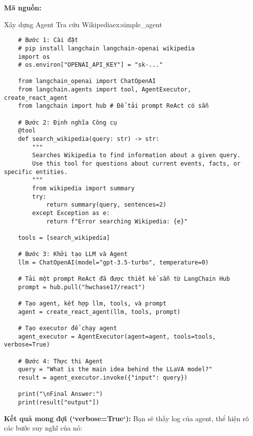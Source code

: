 \textbf{Mã nguồn:}
\begin{example}{Xây dựng Agent Tra cứu Wikipedia}{ex:simple_agent}
    \begin{verbatim}
    # Bước 1: Cài đặt
    # pip install langchain langchain-openai wikipedia
    import os
    # os.environ["OPENAI_API_KEY"] = "sk-..."
    
    from langchain_openai import ChatOpenAI
    from langchain.agents import tool, AgentExecutor, create_react_agent
    from langchain import hub # Để tải prompt ReAct có sẵn
    
    # Bước 2: Định nghĩa Công cụ
    @tool
    def search_wikipedia(query: str) -> str:
        """
        Searches Wikipedia to find information about a given query.
        Use this tool for questions about current events, facts, or specific entities.
        """
        from wikipedia import summary
        try:
            return summary(query, sentences=2)
        except Exception as e:
            return f"Error searching Wikipedia: {e}"
    
    tools = [search_wikipedia]
    
    # Bước 3: Khởi tạo LLM và Agent
    llm = ChatOpenAI(model="gpt-3.5-turbo", temperature=0)
    
    # Tải một prompt ReAct đã được thiết kế sẵn từ LangChain Hub
    prompt = hub.pull("hwchase17/react")
    
    # Tạo agent, kết hợp llm, tools, và prompt
    agent = create_react_agent(llm, tools, prompt)
    
    # Tạo executor để chạy agent
    agent_executor = AgentExecutor(agent=agent, tools=tools, verbose=True)
    
    # Bước 4: Thực thi Agent
    query = "What is the main idea behind the LLaVA model?"
    result = agent_executor.invoke({"input": query})
    
    print("\nFinal Answer:")
    print(result["output"])
    \end{verbatim}
\end{example}
\textbf{Kết quả mong đợi (`verbose=True`):} Bạn sẽ thấy log của agent, thể hiện rõ các bước suy nghĩ của nó:
